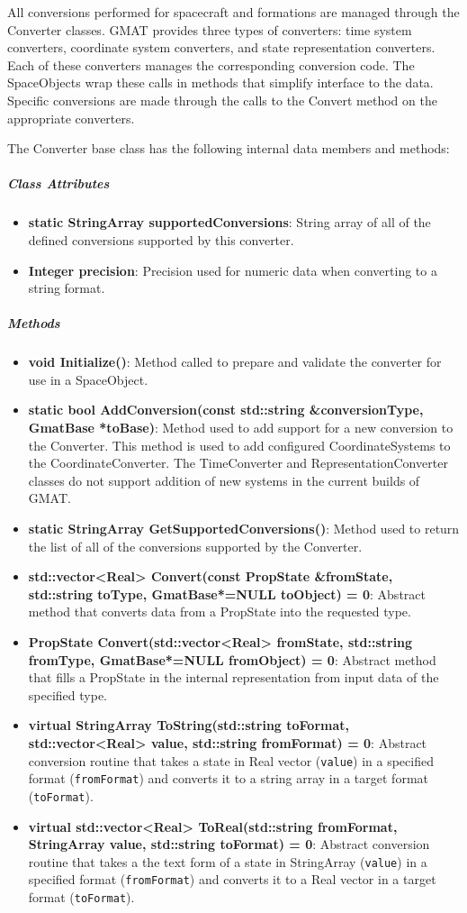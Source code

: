 All conversions performed for spacecraft and formations are managed through the Converter classes.
GMAT provides three types of converters: time system converters, coordinate system converters, and
state representation converters.  Each of these converters manages the corresponding conversion
code.  The SpaceObjects wrap these calls in methods that simplify interface to the data.  Specific
conversions are made through the calls to the Convert method on the appropriate converters.

The Converter base class has the following internal data members and methods:

\subparagraph{\textit{Class Attributes}}

\begin{itemize}
\item \textbf{static StringArray supportedConversions}: String array of all of the defined
conversions supported by this converter.
\item \textbf{Integer precision}: Precision used for numeric data when converting to a string
format.
\end{itemize}

\subparagraph{\textit{Methods}}

\begin{itemize}
\item \textbf{void Initialize()}: Method called to prepare and validate the converter for use in a
SpaceObject.
\item \textbf{static bool AddConversion(const std::string \&conversionType, GmatBase *toBase)}:
Method used to add support for a new conversion to the Converter.  This method is used to add
configured CoordinateSystems to the CoordinateConverter.  The TimeConverter and
RepresentationConverter classes do not support addition of new systems in the current builds of
GMAT.
\item \textbf{static StringArray GetSupportedConversions()}: Method used to return the list of all
of the conversions supported by the Converter.
\item \textbf{std::vector<Real> Convert(const PropState \&fromState, std::string toType,
GmatBase*=NULL
toObject) = 0}: Abstract method that converts data from a PropState into the requested type.
\item \textbf{PropState Convert(std::vector<Real> fromState, std::string fromType, GmatBase*=NULL
fromObject) = 0}: Abstract method that fills a PropState in the internal representation from
input data of the specified type.
\item \textbf{virtual StringArray ToString(std::string toFormat, std::vector<Real> value,
std::string fromFormat) = 0}: Abstract conversion routine that takes a state in Real vector
(\texttt{value}) in a specified format (\texttt{fromFormat}) and converts it to a string array in a
target format (\texttt{toFormat}).
\item \textbf{virtual std::vector<Real> ToReal(std::string fromFormat, StringArray value,
std::string toFormat) = 0}: Abstract conversion routine that takes a the text form of a state in
StringArray (\texttt{value}) in a specified format (\texttt{fromFormat}) and converts it to a Real
vector in a target format (\texttt{toFormat}).
\end{itemize}


